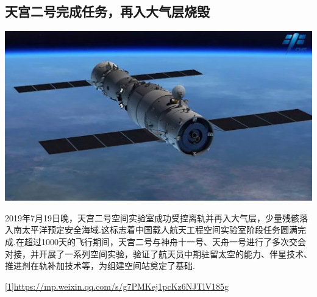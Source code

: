 \begin{multicols}{2}
\subsection*{天宫二号完成任务，再入大气层烧毁}

{\centering\includegraphics[width=0.8\linewidth]{Interstellar/IMG/201907/11.jpg}\vskip0cm}

2019年7月19日晚，天宫二号空间实验室成功受控离轨并再入大气层，少量残骸落入南太平洋预定安全海域.这标志着中国载人航天工程空间实验室阶段任务圆满完成.在超过1000天的飞行期间，天宫二号与神舟十一号、天舟一号进行了多次交会对接，并开展了一系列空间实验，验证了航天员中期驻留太空的能力、伴星技术、推进剂在轨补加技术等，为组建空间站奠定了基础.

\noindent {}

\noindent\url{[1]https://mp.weixin.qq.com/s/g7PMKej1pcKz6NJTlV185g}
\end{multicols}\newpage
{}
